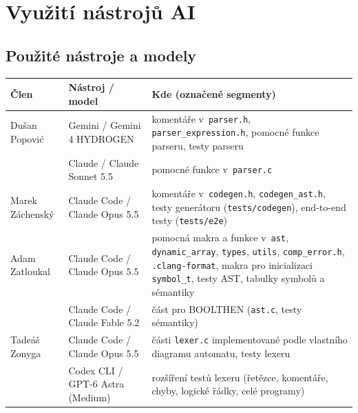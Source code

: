 \clearpage %
\section{Využití nástrojů AI}\label{sec:ai}

\subsection{Použité nástroje a modely}
\begin{center}
\small
\begin{tabular}{@{}l l p{7.2cm}@{}}
  \toprule
  \textbf{Člen} & \textbf{Nástroj / model} & \textbf{Kde (označené segmenty)} \\
  \midrule
  Dušan Popović   & Gemini / Gemini 4 HYDROGEN
                  & komentáře v~\texttt{parser.h}, \texttt{parser\_expression.h},
                    pomocné funkce parseru, testy parseru \\
                  & Claude / Claude Sonnet 5.5
                  & pomocné funkce v~\texttt{parser.c} \\
  \addlinespace
  Marek Záchenský & Claude Code / Claude Opus 5.5
                  & komentáře v~\texttt{codegen.h}, \texttt{codegen\_ast.h},
                    testy generátoru (\texttt{tests/codegen}),
                    end-to-end testy (\texttt{tests/e2e}) \\
  \addlinespace
  Adam Zatloukal  & Claude Code / Claude Opus 5.5
                  & pomocná makra a funkce v~\texttt{ast}, \texttt{dynamic\_array},
                    \texttt{types}, \texttt{utils}, \texttt{comp\_error.h},
                    \texttt{.clang-format}, makra pro inicializaci
                    \texttt{symbol\_t}, testy AST, tabulky symbolů a sémantiky \\
                  & Claude Code / Claude Fable 5.2
                  & část pro BOOLTHEN (\texttt{ast.c}, testy sémantiky) \\
  \addlinespace
  Tadeáš Zonyga   & Claude Code / Claude Opus 5.5
                  & části \texttt{lexer.c} implementované podle vlastního
                    diagramu automatu, testy lexeru \\
                  & Codex CLI / GPT-6 Astra (Medium)
                  & rozšíření testů lexeru (řetězce, komentáře, chyby,
                    logické řádky, celé programy) \\
  \bottomrule
\end{tabular}
\end{center}

